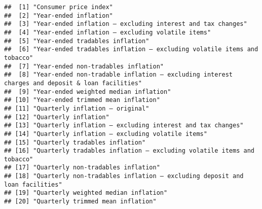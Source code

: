 \documentclass[]{article}
\newenvironment{Shaded}{\begin{snugshade}}{\end{snugshade}}
\newcommand{\KeywordTok}[1]{\textcolor[rgb]{0.13,0.29,0.53}{\textbf{#1}}}
\newcommand{\OperatorTok}[1]{\textcolor[rgb]{0.81,0.36,0.00}{\textbf{#1}}}
\newcommand{\NormalTok}[1]{#1}
\begin{document}
\begin{Shaded}
\end{Shaded}

\begin{verbatim}
##  [1] "Consumer price index"                                                                        
##  [2] "Year-ended inflation"                                                                        
##  [3] "Year-ended inflation – excluding interest and tax changes"                                   
##  [4] "Year-ended inflation – excluding volatile items"                                             
##  [5] "Year-ended tradables inflation"                                                              
##  [6] "Year-ended tradables inflation – excluding volatile items and tobacco"                       
##  [7] "Year-ended non-tradables inflation"                                                          
##  [8] "Year-ended non-tradable inflation – excluding interest charges and deposit & loan facilities"
##  [9] "Year-ended weighted median inflation"                                                        
## [10] "Year-ended trimmed mean inflation"                                                           
## [11] "Quarterly inflation – original"                                                              
## [12] "Quarterly inflation"                                                                         
## [13] "Quarterly inflation – excluding interest and tax changes"                                    
## [14] "Quarterly inflation – excluding volatile items"                                              
## [15] "Quarterly tradables inflation"                                                               
## [16] "Quarterly tradables inflation – excluding volatile items and tobacco"                        
## [17] "Quarterly non-tradables inflation"                                                           
## [18] "Quarterly non-tradables inflation – excluding deposit and loan facilities"                   
## [19] "Quarterly weighted median inflation"                                                         
## [20] "Quarterly trimmed mean inflation"
\end{verbatim}

\begin{Shaded}
\end{Shaded}
\end{document}
